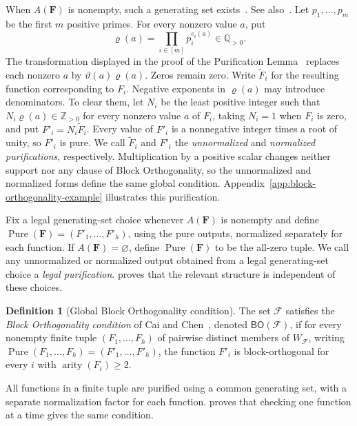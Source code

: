 \documentclass[11pt,letterpaper,onecolumn]{article}
\theoremstyle{plain}
\theoremstyle{definition}
\newtheorem{definition}[definition]{Definition}
\theoremstyle{remark}
\newcommand{\cF}{\mathcal F}
\newcommand{\BO}{\mathsf{BO}}
\DeclareMathOperator{\Pure}{Pure}
\DeclareMathOperator{\arity}{arity}
\begin{document}
When $A(\mathbf F)$ is nonempty, such a generating set
exists~\cite[Lemma~7.3]{CaiChenLu2013}. See
also~\cite[Lemma~8]{CaiChen2017}.  Let $p_1,\ldots,p_m$ be the first $m$
positive primes.
For every nonzero value $a$, put
\[
  \varrho(a)=\prod_{i\in[m]} p_i^{e_i(a)}\in\mathbb Q_{>0}.
\]
The transformation displayed in the proof of the Purification
Lemma~\cite[Lemma~7]{CaiChen2017} replaces each nonzero $a$ by
$\vartheta(a)\varrho(a)$. Zeros remain zero.  Write $\widetilde F_i$ for
the resulting function corresponding to $F_i$.
Negative exponents in $\varrho(a)$ may introduce denominators.
To clear them, let $N_i$ be the least positive integer such that
$N_i\varrho(a)\in\mathbb Z_{>0}$ for every nonzero value $a$ of $F_i$, taking
$N_i=1$ when $F_i$ is zero, and put $F'_i=N_i\widetilde F_i$.
Every value of $F'_i$ is a nonnegative integer times a root of unity,
so $F'_i$ is pure.  We call $\widetilde F_i$ and $F'_i$ the
\emph{unnormalized} and \emph{normalized purifications}, respectively.
Multiplication by a positive scalar
changes neither support nor any clause of Block Orthogonality, so the unnormalized
and normalized forms define the same global condition.
Appendix~\ref{app:block-orthogonality-example} illustrates this purification.

Fix a legal generating-set choice whenever $A(\mathbf F)$ is nonempty and
define $\Pure(\mathbf F)=(F'_1,\ldots,F'_h)$, using the pure outputs,
normalized separately for each function.  If $A(\mathbf F)=\varnothing$,
define $\Pure(\mathbf F)$ to be the
all-zero tuple.  We call any unnormalized or normalized output obtained from a
legal generating-set choice a \emph{legal purification}.
 proves that the relevant structure is
independent of these choices.

\begin{definition}[Global Block Orthogonality condition]
\label{def:global-bo}
The set $\cF$ satisfies the \emph{Block Orthogonality condition} of Cai
and Chen~\cite[Section~3.1]{CaiChen2017}, denoted $\BO(\cF)$, if for every
nonempty finite tuple
$(F_1,\ldots,F_h)$ of pairwise distinct members of $W_{\cF}$, writing $\Pure(F_1,\ldots,F_h)=(F'_1,\ldots,F'_h)$, the function $F'_i$ is block-orthogonal for every $i$ with
$\arity(F_i)\ge2$.
\end{definition}

All functions in a finite tuple are purified using a common generating set,
with a separate normalization factor for each function.
 proves that checking one function at a
time gives the same condition.
\end{document}
